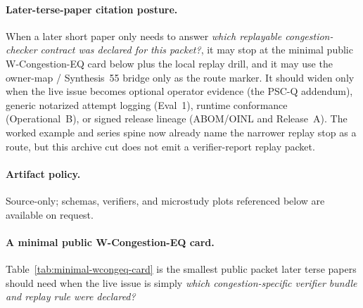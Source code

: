 \documentclass[11pt]{article}
\begin{document}
\paragraph{Later-terse-paper citation posture.}
When a later short paper only needs to answer \emph{which replayable congestion-checker contract was declared for this packet?}, it may stop at the minimal public W-Congestion-EQ card below plus the local replay drill, and it may use the owner-map / Synthesis~55 bridge only as the route marker.
It should widen only when the live issue becomes optional operator evidence (the PSC-Q addendum), generic notarized attempt logging (Eval~1), runtime conformance (Operational~B), or signed release lineage (ABOM/OINL and Release~A). The worked example and series spine now already name the narrower replay stop as a route, but this archive cut does not emit a verifier-report replay packet.\cite{series:workedexample,series:seriesspines,series:pscqaddendum,series:evalnotary,series:operationalB,series:abom,series:release}

\paragraph{Artifact policy.}
Source-only; schemas, verifiers, and microstudy plots referenced below are available on request.\cite{series:artifactpolicy}

\paragraph{A minimal public W-Congestion-EQ card.}
Table~\ref{tab:minimal-wcongeq-card} is the smallest public packet later terse papers should need when the live issue is simply \emph{which congestion-specific verifier bundle and replay rule were declared?}
\end{document}
